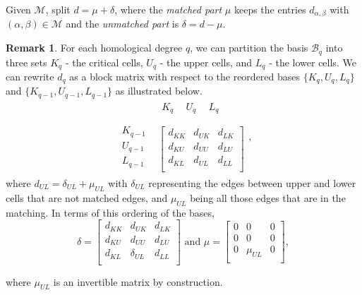 \documentclass[12pt]{amsart}
\theoremstyle{plain}
\theoremstyle{definition}
\newtheorem{remark}[theorem]{Remark}
\newcommand{\M}{\mathcal{M}}
\newcommand{\B}{\mathcal{B}}
\begin{document}
Given $\M$, split $d = \mu + \delta$, where the \emph{matched part} $\mu$ keeps the entries $d_{\alpha,\beta}$ with $(\alpha, \beta) \in \M$ and the \emph{unmatched part} is $\delta = d - \mu$.

\begin{remark} \label{rem:blockmu}
    For each homological degree $q$, we can partition the basis $\B_q$ into three sets $K_q$ - the critical cells, $U_q$ - the upper cells, and $L_q$ - the lower cells. We can rewrite $d_q$ as a block matrix with respect to the reordered bases $\{K_q, U_q,L_q\}$ and $\{K_{q-1}, U_{q-1},L_{q-1}\}$ as illustrated below.
    $$\begin{array}{cc}
     & \begin{array}{ccc}
     K_q \ \  & U_q \ \ & L_q\\
     \end{array}\\
    \begin{array}{c}
         K_{q-1} \\
         U_{q-1}\\
         L_{q-1}\\
    \end{array}&\left[\begin{array}{c|c|c}
     d_{KK}&d_{UK}  & d_{LK} \\
    \hline
    d_{KU}  & d_{UU}  & d_{LU} \\
    \hline
    d_{KL} & d_{UL} & d_{LL} \\\end{array}\right]\end{array},$$
where $d_{UL}=\delta_{UL}+\mu_{UL}$ with $\delta_{UL}$ representing the edges between upper and lower cells that are not matched edges, and $\mu_{UL}$ being all those edges that are in the matching.
In terms of this ordering of the bases, $$\delta= \left[\begin{array}{c|c|c}
     d_{KK}&d_{UK}  & d_{LK} \\
    \hline
    d_{KU}  & d_{UU}  & d_{LU} \\
    \hline
    d_{KL} & \delta_{UL} & d_{LL} \\\end{array}\right] \text{ and } \mu=\left[\begin{array}{c|c|c}
     0& 0  & 0 \\
    \hline
    0  & 0 & 0 \\
    \hline
    0 & \mu_{UL} & 0 \\\end{array}\right],$$

    \noindent where $\mu_{UL}$ is an invertible matrix by construction.

\end{remark}
\end{document}
